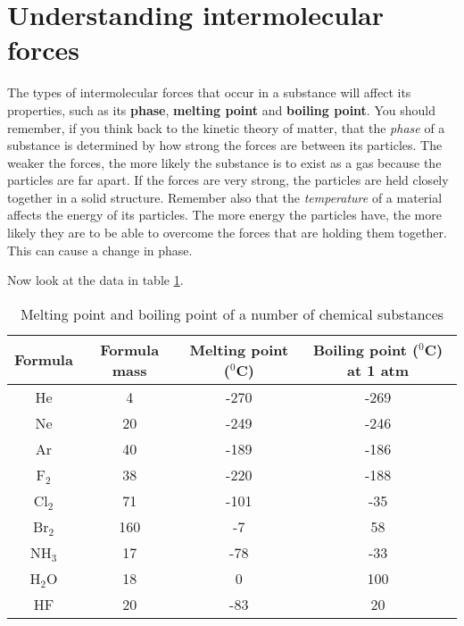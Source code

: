 \section{Understanding intermolecular forces}
\label{sec:intermolecular:understanding}

The types of intermolecular forces that occur in a substance will affect its properties, such as its \textbf{phase}, \textbf{melting point} and \textbf{boiling point}. You should remember, if you think back to the kinetic theory of matter, that the \textit{phase} of a substance is determined by how strong the forces are between its particles. The weaker the forces, the more likely the substance is to exist as a gas because the particles are far apart. If the forces are very strong, the particles are held closely together in a solid structure. Remember also that the \textit{temperature} of a material affects the energy of its particles. The more energy the particles have, the more likely they are to be able to overcome the forces that are holding them together. This can cause a change in phase. 



Now look at the data in table \ref{tab:intermolecular:mpbp}.

\begin{table}[h]
\begin{center}
\begin{tabular}{|c|c|c|c|}\hline
\textbf{Formula} & \textbf{Formula mass} & \textbf{Melting point} ($^{0}$C) & \textbf{Boiling point} ($^{0}$C) at 1 atm \\\hline
He & 4 & -270 & -269 \\\hline
Ne & 20 & -249 & -246 \\\hline
Ar & 40 & -189 & -186 \\\hline
F$_{2}$ & 38 & -220 & -188 \\\hline
Cl$_{2}$ & 71 & -101 & -35 \\\hline
Br$_{2}$ & 160 & -7 & 58 \\\hline
NH$_{3}$ & 17 & -78 & -33 \\\hline
H$_{2}$O & 18 & 0 & 100 \\\hline
HF & 20 & -83 & 20 \\\hline
\end{tabular}
\caption{Melting point and boiling point of a number of chemical substances}
\label{tab:intermolecular:mpbp}
\end{center}
\end{table}

